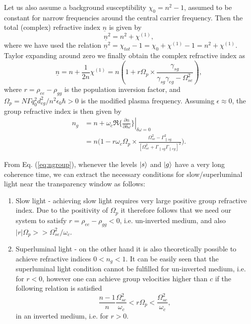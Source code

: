 \documentclass[twocolumn,secnumarabic,amssymb, nobibnotes, aps, prd]{revtex4-1}
\def\p{\partial}
\begin{document}
Let us also assume a background susceptibility $\chi_0 = n^2-1$, assumed to be constant for narrow frequencies around the central carrier frequency. Then the total (complex) refractive index $\underline{n}$ is given by
\begin{equation}
\underline{n}^2 = n^2+\chi^{(1)},   
\end{equation}
where we have used the relation $ \underline{n}^2 = \chi_{tot} -1 = \chi_{0} + \chi^{(1)} - 1 = n^2 + \chi^{(1)}$. Taylor expanding around zero we finally obtain the complex refractive index as
\begin{equation}
	\underline{n} = n+\frac{1}{2n}\chi^{(1)}= n(1+r\Omega_p\times \frac{\gamma_{sg}}{\gamma_{sg}\gamma_{eg} -\Omega_{se}^2  }),
\end{equation}
where $r = \rho_{ee} - \rho_{gg}$ is the population inversion factor, and $\Omega_p = N\Gamma q_0^2d_{eg}^2/n^2\epsilon_0\hbar > 0$ is the modified plasma frequency. Assuming $\epsilon \approx 0$, the group refractive index is then given by 
\begin{align}
\label{eq:ngroup}
	n_g &= n +\omega_c  \left .\Re\{\frac{\p \underline{n}}{\p \delta\omega} \}\right |_{\delta \omega = 0} \nonumber \\
		&= n\Big (1-r\omega_c\Omega_p \times \frac{\Omega_{se}^2 -\Gamma_{\parallel sg}^2} {[\Omega_{se}^2 +\Gamma_{\parallel sg}\Gamma_{\parallel eg}]^2}  \Big).
\end{align}

From Eq. (\ref{eq:ngroup}), whenever the levels $\ket{s}$ and $\ket{g}$ have a very long coherence time, we can extract the necessary conditions for slow/superluminal light near the transparency window as follows:
\begin{enumerate}
	\item Slow light - achieving slow light requires very large positive group refractive index. Due to the positivity of $\Omega_p$ it therefore follows that we need our system to satisfy $r=\rho_{ee}-\rho_{gg} <0 $, i.e. un-inverted medium, and also $ |r| \Omega_p >> \Omega_{se}^2/\omega_c$. 
	\item Superluminal light - on the other hand it is also theoretically possible to achieve refractive indices $0<n_g<1$. It can be easily seen that the superluminal light condition cannot be fulfilled for un-inverted medium, i.e. 
	for $r < 0$, however one can achieve group velocities higher than $c$ if the following relation is satisfied
	\begin{equation}
	\label{eq:superluminal}
		\frac{n-1}{n}\frac{\Omega_{se}^2}{\omega_c} < r\Omega_p < \frac{\Omega_{se}^2}{\omega_c}, 
	\end{equation}   
	in an inverted medium, i.e. for $r > 0$.
\end{enumerate}
\end{document}
